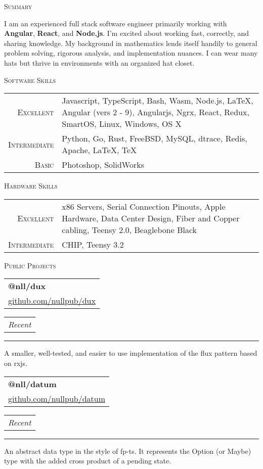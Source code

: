 \documentclass{article}
\makeatletter
\newcommand{\split}[3]{
\noindent\begin{tabular}[t]{@{}l}
    \textbf{#1} \\ #2
\end{tabular}
\hfill
\begin{tabular}[t]{l@{}}
    \\
    \textit{#3}
\end{tabular}
\noindent\rule{\columnwidth}{0.5pt}
}
\newcommand{\sub}[1]{
    {\raggedleft
        \large{\textsc{\color{OliveGreen}#1}}\par
    }
}
\makeatother
\begin{document}
\begin{multicols}{2}
\iffalse

\split{GoDaddy.com}{Data Center Engineer}{Aug 2007 -- Aug 2010}
Was responsible for the build out and maintenance of \textbf{enterprise level data centers}. \textbf{Trained} junior technicians. \textbf{Headed critical deployments} for the data center team. Acted as the \textbf{final tier of customer support}. Created and maintained the data center team \textbf{knowledge base}.

\split{Magenta Computer}{Technician}{Aug 2001 -- Aug 2004}
\textbf{Server manufacturing}, hardware and software \textbf{troubleshooting}, and \textbf{data recovery}. I cut my teeth here on everything from Intel's 486DX2 to the first Xeons and beyond.
\fi

\columnbreak

\sub{Summary}
I am an experienced full stack software engineer primarily working with \textbf{Angular}, \textbf{React}, and \textbf{Node.js}. I'm excited about working fast, correctly, and sharing knowledge. My background in mathematics lends itself handily to general problem solving, rigorous analysis, and implementation nuances. I can wear many hats but thrive in environments with an organized hat closet.

\sub{Software Skills}
\begin{tabular}{r|p{61mm}}
\textsc{Excellent} & Javascript, TypeScript, Bash, Wasm, Node.js, \LaTeX, Angular (vers 2 - 9), Angularjs, Ngrx, React, Redux, SmartOS, Linux, Windows, OS X \\
\textsc{Intermediate} & Python, Go, Rust, FreeBSD, MySQL, dtrace, Redis, Apache, \LaTeX, \TeX \\
\textsc{Basic} & Photoshop, SolidWorks
\end{tabular}

\sub{Hardware Skills}
\begin{tabular}{r|p{61mm}}
\textsc{Excellent} & x86 Servers, Serial Connection Pinouts, Apple Hardware, Data Center Design, Fiber and Copper cabling, Teensy 2.0, Beaglebone Black \\
\textsc{Intermediate} & CHIP, Teensy 3.2
\end{tabular}

\sub{Public Projects}
\split{@nll/dux}{\href{https://github.com/nullpub/dux}{github.com/nullpub/dux}}{Recent}
A smaller, well-tested, and easier to use implementation of the flux pattern based on rxjs.

\split{@nll/datum}{\href{https://github.com/nullpub/datum}{github.com/nullpub/datum}}{Recent}
An abstract data type in the style of fp-ts. It represents the Option (or Maybe) type with the added cross product of a pending state.


\end{multicols}
\end{document}
